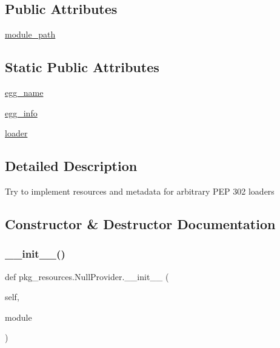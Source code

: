 \subsection*{Public Attributes}
\begin{DoxyCompactItemize}
\item 
\hyperlink{classpkg__resources_1_1NullProvider_a90c7b6ef27446c70d03cb2b634b31e97}{module\+\_\+path}
\end{DoxyCompactItemize}
\subsection*{Static Public Attributes}
\begin{DoxyCompactItemize}
\item 
\hyperlink{classpkg__resources_1_1NullProvider_a9f438778df10c5f6cf89c050381bb17b}{egg\+\_\+name}
\item 
\hyperlink{classpkg__resources_1_1NullProvider_a739c7496ab220e70cd8d53b9617cd0bf}{egg\+\_\+info}
\item 
\hyperlink{classpkg__resources_1_1NullProvider_a824227ff9d57076b31e81215e482615e}{loader}
\end{DoxyCompactItemize}


\subsection{Detailed Description}
\begin{DoxyVerb}Try to implement resources and metadata for arbitrary PEP 302 loaders\end{DoxyVerb}
 

\subsection{Constructor \& Destructor Documentation}
\mbox{\label{classpkg__resources_1_1NullProvider_a7812e3926f7b0ab60ce1a83d685f91cf}} 
\subsubsection{\texorpdfstring{\+\_\+\+\_\+init\+\_\+\+\_\+()}{\_\_init\_\_()}}
{\footnotesize\ttfamily def pkg\+\_\+resources.\+Null\+Provider.\+\_\+\+\_\+init\+\_\+\+\_\+ (\begin{DoxyParamCaption}\item[{}]{self,  }\item[{}]{module }\end{DoxyParamCaption})}



